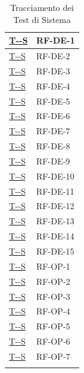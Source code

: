 \documentclass[a4paper,12pt]{article}
\newcounter{testsys}
\newcommand{\systestref}{%
  \hyperlink{T-\arabic{testsys}-S}{T-\arabic{testsys}-S}%
}
\begin{document}
\begin{center}
\begin{longtable}{|>{\centering\arraybackslash}p{5cm}|>{\centering\arraybackslash}p{9cm}|}
\stepcounter{testsys}
\systestref & RF-DE-1 \\
\hline

\stepcounter{testsys}
\systestref & RF-DE-2 \\
\hline

\stepcounter{testsys}
\systestref & RF-DE-3 \\
\hline

\stepcounter{testsys}
\systestref & RF-DE-4 \\
\hline

\stepcounter{testsys}
\systestref & RF-DE-5 \\
\hline

\stepcounter{testsys}
\systestref & RF-DE-6 \\
\hline

\stepcounter{testsys}
\systestref & RF-DE-7 \\
\hline

\stepcounter{testsys}
\systestref & RF-DE-8 \\
\hline

\stepcounter{testsys}
\systestref & RF-DE-9 \\
\hline

\stepcounter{testsys}
\systestref & RF-DE-10 \\
\hline

\stepcounter{testsys}
\systestref & RF-DE-11 \\
\hline

\stepcounter{testsys}
\systestref & RF-DE-12 \\
\hline

\stepcounter{testsys}
\systestref & RF-DE-13 \\
\hline

\stepcounter{testsys}
\systestref & RF-DE-14 \\
\hline

\stepcounter{testsys}
\systestref & RF-DE-15 \\
\hline

\stepcounter{testsys}
\systestref & RF-OP-1 \\
\hline

\stepcounter{testsys}
\systestref & RF-OP-2 \\
\hline

\stepcounter{testsys}
\systestref & RF-OP-3 \\
\hline

\stepcounter{testsys}
\systestref & RF-OP-4 \\
\hline

\stepcounter{testsys}
\systestref & RF-OP-5 \\
\hline

\stepcounter{testsys}
\systestref & RF-OP-6 \\
\hline

\stepcounter{testsys}
\systestref & RF-OP-7 \\
\hline
\rowcolor{white}
\caption{Tracciamento dei Test di Sistema} \label{tab:tracciamento_test_sistema} \\
\end{longtable}
\end{center}
\endgroup
\end{document}
